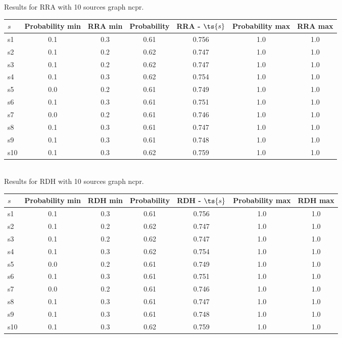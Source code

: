 \documentclass{article}
\begin{document}
\noindent Results for RRA with 10 sources graph ncpr.

\noindent\begin{tabular}{|l|c|c|c|c|c|c|}
\hline
$s$& Probability min & RRA min & Probability & RRA - $\ts{s}$ & Probability max & RRA max\\
\hline
s1 &0.1 & 0.3 & 0.61 & 0.756 & 1.0 & 1.0\\
\hline
s2 &0.1 & 0.2 & 0.62 & 0.747 & 1.0 & 1.0\\
\hline
s3 &0.1 & 0.2 & 0.62 & 0.747 & 1.0 & 1.0\\
\hline
s4 &0.1 & 0.3 & 0.62 & 0.754 & 1.0 & 1.0\\
\hline
s5 &0.0 & 0.2 & 0.61 & 0.749 & 1.0 & 1.0\\
\hline
s6 &0.1 & 0.3 & 0.61 & 0.751 & 1.0 & 1.0\\
\hline
s7 &0.0 & 0.2 & 0.61 & 0.746 & 1.0 & 1.0\\
\hline
s8 &0.1 & 0.3 & 0.61 & 0.747 & 1.0 & 1.0\\
\hline
s9 &0.1 & 0.3 & 0.61 & 0.748 & 1.0 & 1.0\\
\hline
s10 &0.1 & 0.3 & 0.62 & 0.759 & 1.0 & 1.0\\
\hline
\end{tabular}\\

\noindent Results for RDH with 10 sources graph ncpr.

\noindent\begin{tabular}{|l|c|c|c|c|c|c|}
\hline
$s$& Probability min & RDH min & Probability & RDH - $\ts{s}$ & Probability max & RDH max\\
\hline
s1 &0.1 & 0.3 & 0.61 & 0.756 & 1.0 & 1.0\\
\hline
s2 &0.1 & 0.2 & 0.62 & 0.747 & 1.0 & 1.0\\
\hline
s3 &0.1 & 0.2 & 0.62 & 0.747 & 1.0 & 1.0\\
\hline
s4 &0.1 & 0.3 & 0.62 & 0.754 & 1.0 & 1.0\\
\hline
s5 &0.0 & 0.2 & 0.61 & 0.749 & 1.0 & 1.0\\
\hline
s6 &0.1 & 0.3 & 0.61 & 0.751 & 1.0 & 1.0\\
\hline
s7 &0.0 & 0.2 & 0.61 & 0.746 & 1.0 & 1.0\\
\hline
s8 &0.1 & 0.3 & 0.61 & 0.747 & 1.0 & 1.0\\
\hline
s9 &0.1 & 0.3 & 0.61 & 0.748 & 1.0 & 1.0\\
\hline
s10 &0.1 & 0.3 & 0.62 & 0.759 & 1.0 & 1.0\\
\hline
\end{tabular}\\
\end{document}
